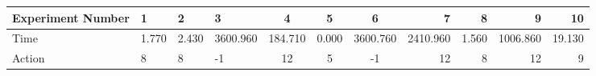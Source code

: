 \documentclass[8pt]{article}
\begin{document}
\begin{landscape}
\begin{tabular}{ | l | l | l | l | c | c | c | r | r | r | r | }
 \hline 
Experiment Number & 1 & 2 & 3 & 4 & 5 & 6 & 7 & 8 & 9 & 10\\ \hline
Time & 1.770 & 2.430 & 3600.960 & 184.710 & 0.000 & 3600.760 & 2410.960 & 1.560 & 1006.860 & 19.130\\ \hline
Action & 8 & 8 & -1 & 12 & 5 & -1 & 12 & 8 & 12 & 9\\ \hline\end{tabular}
\end{landscape}
\end{document}
